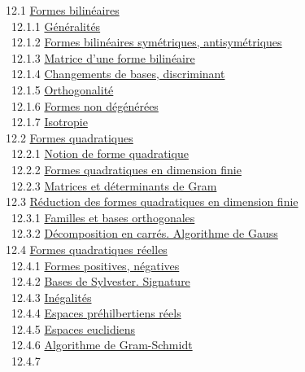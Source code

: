 \documentclass[]{article}
\begin{document}
~12.1 \href{coursse67.html\#x82-36300012.1}{Formes bilinéaires} \\
~~12.1.1 \href{coursse67.html\#x82-36400012.1.1}{Généralités} \\
~~12.1.2 \href{coursse67.html\#x82-36500012.1.2}{Formes bilinéaires
symétriques, antisymétriques} \\ ~~12.1.3
\href{coursse67.html\#x82-36600012.1.3}{Matrice d'une forme bilinéaire}
\\ ~~12.1.4 \href{coursse67.html\#x82-36700012.1.4}{Changements de
bases, discriminant} \\ ~~12.1.5
\href{coursse67.html\#x82-36800012.1.5}{Orthogonalité} \\ ~~12.1.6
\href{coursse67.html\#x82-36900012.1.6}{Formes non dégénérées} \\
~~12.1.7 \href{coursse67.html\#x82-37000012.1.7}{Isotropie} \\ ~12.2
\href{coursse68.html\#x83-37100012.2}{Formes quadratiques} \\ ~~12.2.1
\href{coursse68.html\#x83-37200012.2.1}{Notion de forme quadratique} \\
~~12.2.2 \href{coursse68.html\#x83-37300012.2.2}{Formes quadratiques en
dimension finie} \\ ~~12.2.3
\href{coursse68.html\#x83-37400012.2.3}{Matrices et déterminants de
Gram} \\ ~12.3 \href{coursse69.html\#x84-37500012.3}{Réduction des
formes quadratiques en dimension finie} \\ ~~12.3.1
\href{coursse69.html\#x84-37600012.3.1}{Familles et bases orthogonales}
\\ ~~12.3.2 \href{coursse69.html\#x84-37700012.3.2}{Décomposition en
carrés. Algorithme de Gauss} \\ ~12.4
\href{coursse70.html\#x85-37800012.4}{Formes quadratiques réelles} \\
~~12.4.1 \href{coursse70.html\#x85-37900012.4.1}{Formes positives,
négatives} \\ ~~12.4.2 \href{coursse70.html\#x85-38000012.4.2}{Bases de
Sylvester. Signature} \\ ~~12.4.3
\href{coursse70.html\#x85-38100012.4.3}{Inégalités} \\ ~~12.4.4
\href{coursse70.html\#x85-38200012.4.4}{Espaces préhilbertiens réels} \\
~~12.4.5 \href{coursse70.html\#x85-38300012.4.5}{Espaces euclidiens} \\
~~12.4.6 \href{coursse70.html\#x85-38400012.4.6}{Algorithme de
Gram-Schmidt} \\ ~~12.4.7
\end{document}
